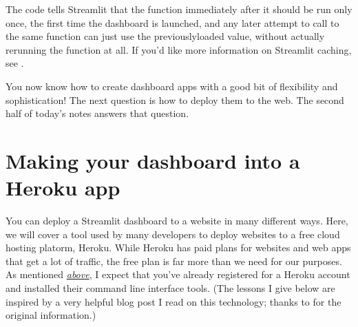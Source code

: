 \documentclass[letterpaper,10pt,english]{jupyterBook}
\begin{document}
\begin{sphinxVerbatim}[commandchars=\\\{\}]
  
       

  
\end{sphinxVerbatim}

\sphinxAtStartPar
The  code tells Streamlit that the function immediately after it should be run only once, the first time the dashboard is launched, and any later attempt to call to the same function can just use the previously\sphinxhyphen{}loaded value, without actually re\sphinxhyphen{}running the function at all.  If you’d like more information on Streamlit caching, see .

\sphinxAtStartPar
You now know how to create dashboard apps with a good bit of flexibility and sophistication!  The next question is how to deploy them to the web.  The second half of today’s notes answers that question.


\section{Making your dashboard into a Heroku app}
\label{\detokenize{chapter-14-dashboards:making-your-dashboard-into-a-heroku-app}}
\sphinxAtStartPar
You can deploy a Streamlit dashboard to a website in many different ways.  Here, we will cover a tool used by many developers to deploy websites to a free cloud hosting platorm, Heroku.  While Heroku has paid plans for websites and web apps that get a lot of traffic, the free plan is far more than we need for our purposes.  As mentioned {\hyperref[\detokenize{chapter-14-dashboards:what-s-a-dashboard-and-why-do-we-have-them}]{\emph{above}}}, I expect that you’ve already registered for a Heroku account and installed their command line interface tools.  (The lessons I give below are inspired by a very helpful blog post I read on this technology; thanks to  for the original information.)
\end{document}
